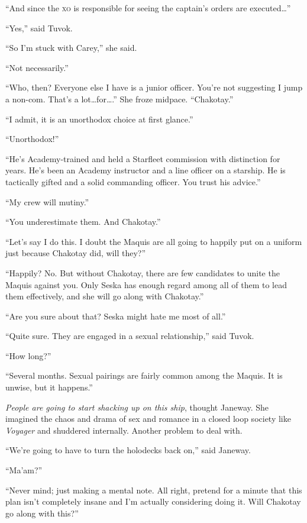 \documentclass[twoside,letterpaper,12pt]{memoir}
\begin{document}
``And since the \textsc{xo} is responsible for seeing the captain’s orders are executed\ldots '' 

``Yes,'' said Tuvok. 

``So I’m stuck with Carey,'' she said. 

``Not necessarily.'' 

``Who, then? Everyone else I have is a junior officer. You’re not suggesting I jump a non-com. That’s a lot\ldots for\ldots .'' She froze midpace. ``Chakotay.'' 

``I admit, it is an unorthodox choice at first glance.'' 

``Unorthodox!'' 

``He’s Academy-trained and held a Starfleet commission with distinction for years. He’s been an Academy instructor and a line officer on a starship. He is tactically gifted and a solid commanding officer. You trust his advice.'' 

``My crew will mutiny.'' 

``You underestimate them. And Chakotay.'' 

``Let’s say I do this. I doubt the Maquis are all going to happily put on a uniform just because Chakotay did, will they?'' 

``Happily? No. But without Chakotay, there are few candidates to unite the Maquis against you. Only Seska has enough regard among all of them to lead them effectively, and she will go along with Chakotay.'' 

``Are you sure about that? Seska might hate me most of all.'' 

``Quite sure. They are engaged in a sexual relationship,'' said Tuvok. 

``How long?'' 

``Several months. Sexual pairings are fairly common among the Maquis. It is unwise, but it happens.'' 

\textit{People are going to start shacking up on this ship}, thought Janeway. She imagined the chaos and drama of sex and romance in a closed loop society like \textit{Voyager} and shuddered internally. Another problem to deal with. 

``We’re going to have to turn the holodecks back on,'' said Janeway. 

``Ma’am?'' 

``Never mind; just making a mental note. All right, pretend for a minute that this plan isn’t completely insane and I’m actually considering doing it. Will Chakotay go along with this?'' 
\end{document}
